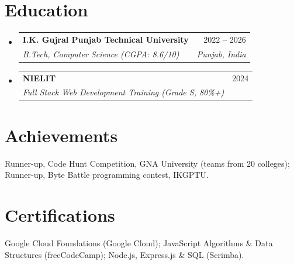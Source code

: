 \documentclass[letterpaper,11pt]{article}
\makeatletter
\newcommand{\resumeSubheading}[4]{
  \vspace{-2pt}\item
    \begin{tabular*}{0.97\textwidth}[t]{l@{\extracolsep{\fill}}r}
      \textbf{#1} & #2 \\
      \textit{\small#3} & \textit{\small #4} \\
    \end{tabular*}\vspace{-7pt}
}
\newcommand{\resumeSubHeadingListStart}{\begin{itemize}[leftmargin=0.15in, label={}]}
\newcommand{\resumeSubHeadingListEnd}{\end{itemize}}
\makeatother
\begin{document}
\section{Education}
  \resumeSubHeadingListStart
    \resumeSubheading
      {I.K. Gujral Punjab Technical University}{2022 -- 2026}
      {B.Tech, Computer Science (CGPA: 8.6/10)}{Punjab, India}
    \resumeSubheading
      {NIELIT}{2024}
      {Full Stack Web Development Training (Grade S, 80\%+)}{}
  \resumeSubHeadingListEnd

\section{Achievements}
 \begin{itemize}[leftmargin=0.15in, label={}]
    \small{\item{
     Runner-up, Code Hunt Competition, GNA University (teams from 20 colleges); Runner-up, Byte Battle programming contest, IKGPTU.
    }}
 \end{itemize}

\section{Certifications}
 \begin{itemize}[leftmargin=0.15in, label={}]
    \small{\item{
     Google Cloud Foundations (Google Cloud); JavaScript Algorithms \& Data Structures (freeCodeCamp); Node.js, Express.js \& SQL (Scrimba).
    }}
 \end{itemize}
\end{document}

